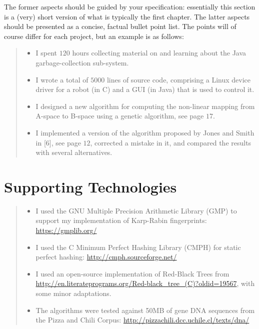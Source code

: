 \documentclass[ %
                    author={Dominic Joseph Moylett},
                    degree={MEng},
                     title={Dictionary Matching with Fingerprints},
                  subtitle={An Empirical Analysis},
                      type={Research},
                      year={2014} ]{dissertation}
\begin{document}
The former aspects should be guided by your specification: essentially 
this section is a (very) short version of what is typically the first 
chapter.  The latter aspects should be presented as a concise, factual 
bullet point list.  The points will of course differ for each project, 
but an example is as follows:

\begin{quote}
\noindent
\begin{itemize}
\item I spent $120$ hours collecting material on and learning about the 
      Java garbage-collection sub-system. 
\item I wrote a total of $5000$ lines of source code, comprising a Linux 
      device driver for a robot (in C) and a GUI (in Java) that is 
      used to control it.
\item I designed a new algorithm for computing the non-linear mapping 
      from A-space to B-space using a genetic algorithm, see page $17$.
\item I implemented a version of the algorithm proposed by Jones and 
      Smith in [6], see page $12$, corrected a mistake in it, and 
      compared the results with several alternatives.
\end{itemize}
\end{quote}

\chapter*{Supporting Technologies}

\begin{quote}
\begin{itemize}
\item I used the GNU Multiple Precision Arithmetic Library (GMP) to support my implementation of Karp-Rabin fingerprints: \url{https://gmplib.org/}
\item I used the C Minimum Perfect Hashing Library (CMPH) for static perfect hashing: \url{http://cmph.sourceforge.net/}
\item I used an open-source implementation of Red-Black Trees from \url{http://en.literateprograms.org/Red-black_tree_(C)?oldid=19567}, with some minor adaptations.
\item The algorithms were tested against 50MB of gene DNA sequences from the Pizza and Chili Corpus: \url{http://pizzachili.dcc.uchile.cl/texts/dna/}
\end{itemize}
\end{quote}
\end{document}
